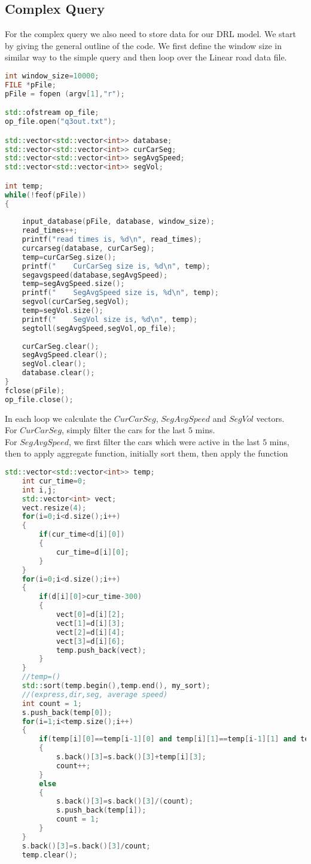 \subsection{Complex Query}
For the complex query we also need to store data for our DRL model. We start by giving the general outline of the code. We first define the window size in similar way to the simple query and then loop over the Linear road data file.
\begin{lstlisting}[language=C++]
int window_size=10000;
FILE *pFile;
pFile = fopen (argv[1],"r");

std::ofstream op_file;
op_file.open("q3out.txt");

std::vector<std::vector<int>> database;
std::vector<std::vector<int>> curCarSeg;
std::vector<std::vector<int>> segAvgSpeed;
std::vector<std::vector<int>> segVol;

int temp;
while(!feof(pFile))
{
    
    input_database(pFile, database, window_size);
    read_times++;
    printf("read times is, %d\n", read_times);
    curcarseg(database, curCarSeg);
    temp=curCarSeg.size();
    printf("    CurCarSeg size is, %d\n", temp);
    segavgspeed(database,segAvgSpeed);
    temp=segAvgSpeed.size();
    printf("    SegAvgSpeed size is, %d\n", temp);
    segvol(curCarSeg,segVol);
    temp=segVol.size();
    printf("    SegVol size is, %d\n", temp);
    segtoll(segAvgSpeed,segVol,op_file);
    
    curCarSeg.clear();
    segAvgSpeed.clear();
    segVol.clear();
    database.clear();
}
fclose(pFile);
op_file.close();
\end{lstlisting}
In each loop we calculate the $CurCarSeg$, $SegAvgSpeed$ and $SegVol$ vectors.\\
For $CurCarSeg$, simply filter the cars for the last $5$ mins.\\
For $SegAvgSpeed$, we first filter the cars which were active in the last $5$ mins, then to apply aggregate function, initially sort them, then apply the function 
\begin{lstlisting}[language=C++]
    std::vector<std::vector<int>> temp;
    int cur_time=0;
    int i,j;
    std::vector<int> vect;
    vect.resize(4);
    for(i=0;i<d.size();i++)
    {
        if(cur_time<d[i][0])
        {
            cur_time=d[i][0];
        }
    }
    for(i=0;i<d.size();i++)
    {
        if(d[i][0]>cur_time-300)
        {
            vect[0]=d[i][2];
            vect[1]=d[i][3];
            vect[2]=d[i][4];
            vect[3]=d[i][6];
            temp.push_back(vect);
        }
    }
    //temp=()
    std::sort(temp.begin(),temp.end(), my_sort);
    //(express,dir,seg, average speed)
    int count = 1;
    s.push_back(temp[0]);
    for(i=1;i<temp.size();i++)
    {
        if(temp[i][0]==temp[i-1][0] and temp[i][1]==temp[i-1][1] and temp[i][2]==temp[i-1][2])
        {
            s.back()[3]=s.back()[3]+temp[i][3];
            count++;
        }
        else
        {
            s.back()[3]=s.back()[3]/(count);
            s.push_back(temp[i]);
            count = 1;
        }
    }
    s.back()[3]=s.back()[3]/count;
    temp.clear();
\end{lstlisting}
 
